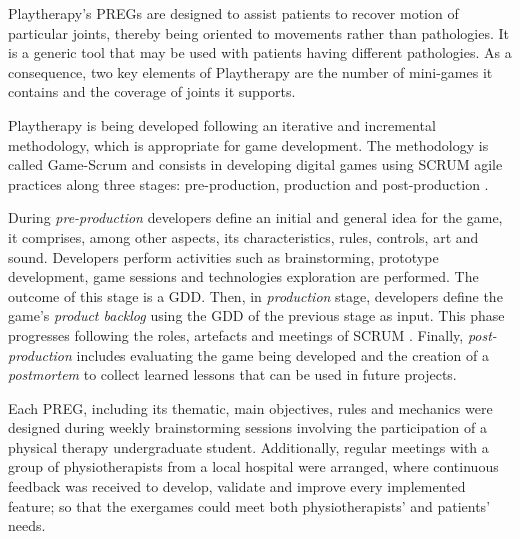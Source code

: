 Playtherapy's \acp{PREG} are designed to assist patients to recover motion of particular joints, thereby being oriented to movements rather than pathologies. It is a generic tool that may be used with patients having different pathologies. As a consequence, two key elements of Playtherapy are the number of mini-games it contains and the coverage of joints it supports.

Playtherapy is being developed following an iterative and incremental methodology, which is appropriate for game development. The methodology is called Game-Scrum and consists in developing digital games using SCRUM agile practices along three stages: pre-production, production and post-production \autocite{godoy2010game}.

During \emph{pre-production} developers define an initial and general idea for the game, it comprises, among other aspects, its characteristics, rules, controls, art and sound. Developers perform activities such as brainstorming, prototype development, game sessions and technologies exploration are performed. The outcome of this stage is a \ac{GDD}. Then, in \emph{production} stage, developers define the game's \textit{product backlog} using the \ac{GDD} of the previous stage as input. This phase progresses following the roles, artefacts and meetings of SCRUM \autocite{keith_agile_2010}. Finally, \emph{post-production} includes evaluating the game being developed and the creation of a \textit{postmortem} to collect learned lessons that can be used in future projects.

Each \ac{PREG}, including its thematic, main objectives, rules and mechanics were designed during weekly brainstorming sessions involving the participation of a physical therapy undergraduate student. Additionally, regular meetings with a group of physiotherapists from a local hospital were arranged, where continuous feedback was received to develop, validate and improve every implemented feature; so that the exergames could meet both physiotherapists' and patients' needs.


